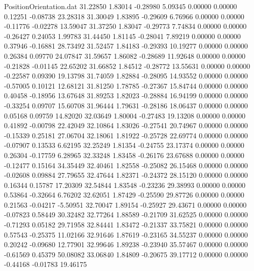 \begin{filecontents}{PositionOrientation.dat}
  31.22850    1.83014   -0.28980     5.09345    0.00000    0.00000    0.12251   -0.08738   23.28318
  31.30049    1.83895   -0.29609     6.76966    0.00000    0.00000   -0.11776   -0.02278   13.59047
  31.37250    1.83047   -0.29773     7.74834    0.00000    0.00000   -0.26427    0.24053    1.99783
  31.44450    1.81145   -0.28041     7.89219    0.00000    0.00000    0.37946   -0.16881   28.73492
  31.52457    1.84183   -0.29393    10.19277    0.00000    0.00000    0.26384    0.09770   24.07847
  31.59657    1.86082   -0.28689    11.92648    0.00000    0.00000   -0.21828   -0.01145   22.65202
  31.66852    1.84512   -0.28772    13.55631    0.00000    0.00000   -0.22587    0.09390   19.13798
  31.74059    1.82884   -0.28095    14.93552    0.00000    0.00000   -0.57005    0.10121   12.68121
  31.81250    1.78785   -0.27367    15.84744    0.00000    0.00000    0.40458   -0.18956   13.67648
  31.89253    1.82023   -0.28884    16.94199    0.00000    0.00000   -0.33254    0.09707   15.60708
  31.96444    1.79631   -0.28186    18.06437    0.00000    0.00000    0.05168    0.09759   14.82020
  32.03649    1.80004   -0.27483    19.13208    0.00000    0.00000    0.41892   -0.00798   22.42049
  32.10864    1.83026   -0.27541    20.74967    0.00000    0.00000   -0.15339    0.25181   27.06704
  32.18061    1.81922   -0.25728    22.69774    0.00000    0.00000   -0.07907    0.13533    6.62195
  32.25249    1.81354   -0.24755    23.17374    0.00000    0.00000    0.26304   -0.17759    6.28965
  32.33248    1.83458   -0.26176    23.67688    0.00000    0.00000   -0.12477    0.15164   34.35449
  32.40461    1.82558   -0.25082    26.15468    0.00000    0.00000   -0.02608    0.09884   27.79655
  32.47644    1.82371   -0.24372    28.15120    0.00000    0.00000    0.16344    0.15787   17.20309
  32.54844    1.83548   -0.23236    29.38993    0.00000    0.00000    0.53864   -0.32664    6.76202
  32.62051    1.87429   -0.25590    29.87726    0.00000    0.00000    0.21563   -0.04217   -5.50951
  32.70047    1.89154   -0.25927    29.43671    0.00000    0.00000   -0.07823    0.58449   30.32482
  32.77264    1.88589   -0.21709    31.62525    0.00000    0.00000   -0.71293    0.05182   29.71958
  32.84441    1.83472   -0.21337    33.75821    0.00000    0.00000    0.57543   -0.25375   11.02166
  32.91646    1.87619   -0.23165    34.55237    0.00000    0.00000    0.20242   -0.09680   12.77901
  32.99646    1.89238   -0.23940    35.57467    0.00000    0.00000   -0.61569    0.45379   50.08082
  33.06840    1.84809   -0.20675    39.17712    0.00000    0.00000   -0.44168   -0.01783   19.46175

\end{filecontents}
